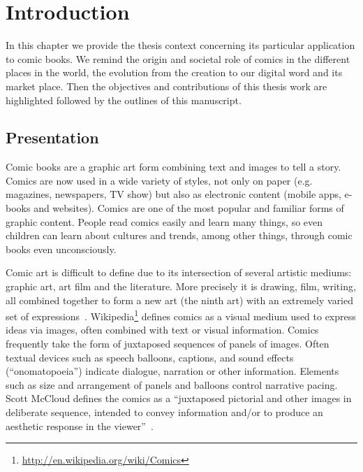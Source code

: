 \chapter{Introduction}%
\label{chap:intro}
\graphicspath{{./chapters/1-intro/figs/}}

In this chapter we provide the thesis context concerning its particular application to comic books.
We remind the origin and societal role of comics in the different places in the world, the evolution from the creation to our digital word and its market place.
Then the objectives and contributions of this thesis work are highlighted followed by the outlines of this manuscript.


\section{Presentation} %
\label{sec:intro:presentation}

Comic books are a graphic art form combining text and images to tell a story.
Comics are now used in a wide variety of styles, not only on paper (e.g. magazines, newspapers, TV show) but also as electronic content (mobile apps, e-books and websites).
Comics are one of the most popular and familiar forms of graphic content.
People read comics easily and learn many things, so even children can learn about cultures and trends, among other things, through comic books even unconsciously.

Comic art is difficult to define due to its intersection of several artistic mediums: graphic art, art film and the literature.
More precisely it is drawing, film, writing, all combined together to form a new art (the ninth art) with an extremely varied set of expressions~\cite{duc1997art}.
Wikipedia\footnote{\url{http://en.wikipedia.org/wiki/Comics}} defines comics as a visual medium used to express ideas via images, often combined with text or visual information.
Comics frequently take the form of juxtaposed sequences of panels of images.
Often textual devices such as speech balloons, captions, and sound effects (``onomatopoeia'') indicate dialogue, narration or other information.
Elements such as size and arrangement of panels and balloons control narrative pacing.
Scott McCloud defines the comics as a ``juxtaposed pictorial and other images in deliberate sequence, intended to convey information and/or to produce an aesthetic response in the viewer''~\cite{mccloud1994understanding}.

